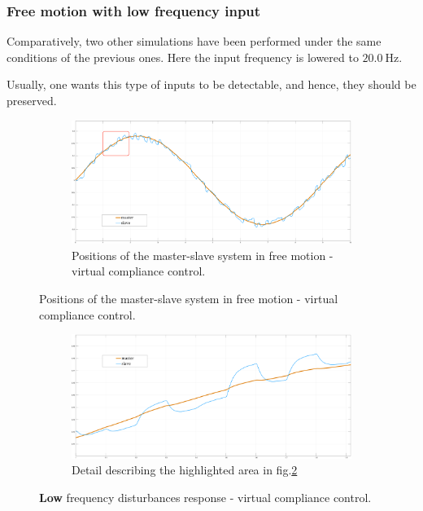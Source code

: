 \subsubsection{Free motion with low frequency input}

Comparatively, two other simulations have been performed under the same
conditions of the previous ones. Here the input frequency is lowered to $20.0 \ \text{Hz}$.

Usually, one wants this type of inputs to be detectable, and hence, they should be preserved. 

\begin{figure}[H]
	\begin{subfigure}{1\linewidth}
		\centering
		\includegraphics[width=\textwidth, height=0.48\textwidth]{Images/freeSet20Tot20HtznoiseRect}
		\caption{Positions of the master-slave system in free motion - virtual compliance control.}
		\label{fig:freeSetTot20HR}
	\end{subfigure}
\end{figure}
\begin{figure}[H]\ContinuedFloat
	\begin{subfigure}{1\linewidth}
		\centering
		\includegraphics[width=\textwidth, height=0.48\textwidth]{Images/freeSet20Part20Htznoise}
		\caption{Detail describing the highlighted area in fig.\ref{fig:freeSetTot20HR}}
		\label{fig:freeSetPar20HR}
	\end{subfigure}	
	\caption{\textbf{Low} frequency disturbances response - virtual compliance control.}
\end{figure}

